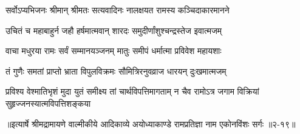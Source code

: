 \twolineshloka
{सर्वोऽप्यभिजनः श्रीमान् श्रीमतः सत्यवादिनः}
{नालक्षयत रामस्य कञ्चिदाकारमानने} %

\twolineshloka
{उचितं च महाबाहुर्न जहौ हर्षमात्मवान्}
{शारदः समुदीर्णांशुश्चन्द्रस्तेज इवात्मजम्} %

\twolineshloka
{वाचा मधुरया रामः सर्वं सम्मानयञ्जनम्}
{मातुः समीपं धर्मात्मा प्रविवेश महायशाः} %

\twolineshloka
{तं गुणैः समतां प्राप्तो भ्राता विपुलविक्रमः}
{सौमित्रिरनुवव्राज धारयन् दुःखमात्मजम्} %

\twolineshloka
{प्रविश्य वेश्मातिभृशं मुदा युतं समीक्ष्य तां चार्थविपत्तिमागताम्}
{न चैव रामोऽत्र जगाम विक्रियां सुहृज्जनस्यात्मविपत्तिशङ्कया} %


॥इत्यार्षे श्रीमद्रामायणे वाल्मीकीये आदिकाव्ये अयोध्याकाण्डे रामप्रतिज्ञा नाम एकोनविंशः सर्गः ॥२-१९॥
